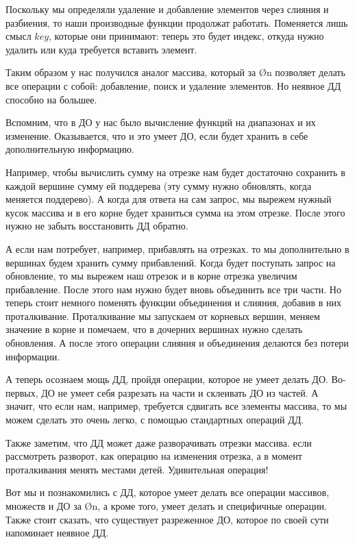 Поскольку мы определяли удаление и добавление элементов через слияния и разбиения, то наши производные функции продолжат работать. Поменяется лишь смысл $key$, которые они принимают: теперь это будет индекс, откуда нужно удалить или куда требуется вставить элемент.

Таким образом у нас получился аналог массива, который за \O{\log n} позволяет делать все операции с собой: добавление, поиск и удаление элементов. Но неявное ДД способно на большее.

Вспомним, что в ДО у нас было вычисление функций на диапазонах и их изменение. Оказывается, что и это умеет ДО, если будет хранить в себе дополнительную информацию.

Например, чтобы вычислить сумму на отрезке нам будет достаточно сохранить в каждой вершине сумму ей поддерева (эту сумму нужно обновлять, когда меняется поддерево). А когда для ответа на сам запрос, мы вырежем нужный кусок массива и в его корне будет храниться сумма на этом отрезке. После этого нужно не забыть восстановить ДД обратно.

А если нам потребует, например, прибавлять на отрезках. то мы дополнительно в вершинах будем хранить сумму прибавлений. Когда будет поступать запрос на обновление, то мы вырежем наш отрезок и в корне отрезка увеличим прибавление. После этого нам нужно будет вновь объединить все три части. Но теперь стоит немного поменять функции объединения и слияния, добавив в них проталкивание. Проталкивание мы запускаем от корневых вершин, меняем значение в корне и помечаем, что в дочерних вершинах нужно сделать обновления. А после этого операции слияния и объединения делаются без потери информации.

А теперь осознаем мощь ДД, пройдя операции, которое не умеет делать ДО. Во-первых, ДО не умеет себя разрезать на части и склеивать ДО из частей. А значит, что если нам, например, требуется сдвигать все элементы массива, то мы можем сделать это очень легко, с помощью стандартных операций ДД.

Также заметим, что ДД может даже разворачивать отрезки массива. если рассмотреть разворот, как операцию на изменения отрезка, а в момент проталкивания менять местами детей. Удивительная операция!

Вот мы и познакомились с ДД, которое умеет делать все операции массивов, множеств и ДО за \O{\log n}, а кроме того, умеет делать и специфичные операции. Также стоит сказать, что существует разреженное ДО, которое по своей сути напоминает неявное ДД.

